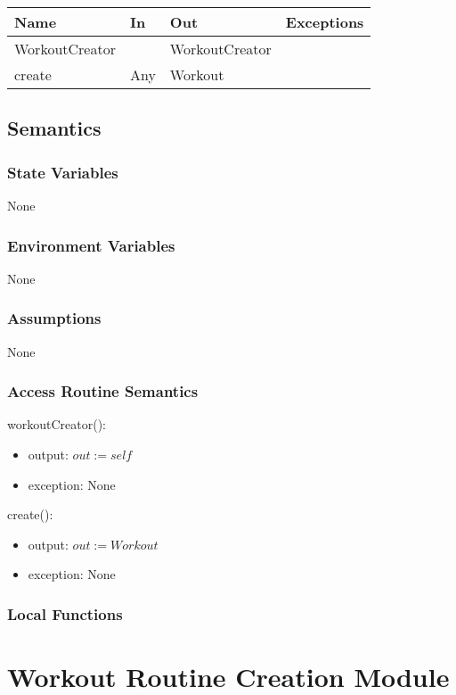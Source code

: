 \documentclass[12pt, titlepage]{article}
\begin{document}
\begin{center}
	\begin{tabular}{p{2cm} p{4cm} p{4cm} p{2cm}}
		\hline
		\textbf{Name} & \textbf{In} & \textbf{Out} & \textbf{Exceptions} \\
		\hline
		WorkoutCreator &  & WorkoutCreator &  \\
		create & Any & Workout &  \\
		\hline
	\end{tabular}
\end{center}

\subsection{Semantics}

\subsubsection{State Variables}
None
\subsubsection{Environment Variables}
None

\subsubsection{Assumptions}
None
\subsubsection{Access Routine Semantics}

\noindent workoutCreator():
\begin{itemize}
	\item output: $out := self$
	\item exception: None
\end{itemize}

\noindent create():
\begin{itemize}
	\item output: $out := Workout$
	\item exception: None
\end{itemize}

\subsubsection{Local Functions}

\newpage

\section{Workout Routine Creation Module}
\end{document}
